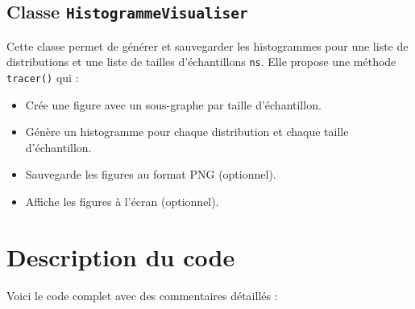 \documentclass{article}
\begin{document}
\subsection{Classe \texttt{HistogrammeVisualiser}}  
Cette classe permet de générer et sauvegarder les histogrammes pour une liste de distributions et une liste de tailles d'échantillons \texttt{ns}. Elle propose une méthode \texttt{tracer()} qui :  
\begin{itemize}  
    \item Crée une figure avec un sous-graphe par taille d'échantillon.  
    \item Génère un histogramme pour chaque distribution et chaque taille d'échantillon.  
    \item Sauvegarde les figures au format PNG (optionnel).  
    \item Affiche les figures à l'écran (optionnel).  
\end{itemize}

\section{Description du code}  
Voici le code complet avec des commentaires détaillés :
\end{document}
